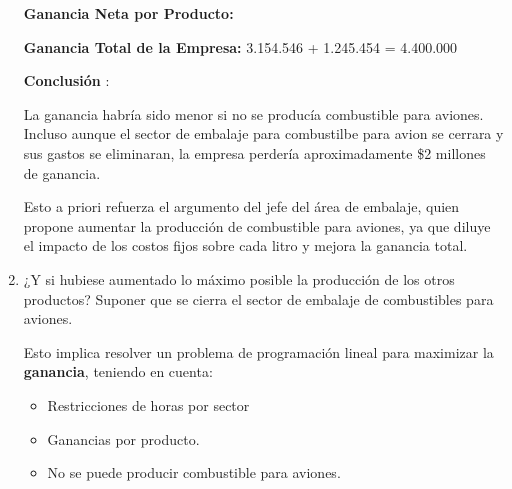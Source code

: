 \documentclass[10pt,a4paper]{article}
\begin{document}
\begin{enumerate}
    \vspace{0.5em}

    \textbf{Ganancia Neta por Producto:} 

    \begin{center}
    \end{center}

    \vspace{0.5em}

    \textbf{Ganancia Total de la Empresa: } 3.154.546 + 1.245.454  = 4.400.000

    \vspace{0.5em}

    \textbf{Conclusión }:

    La ganancia habría sido menor si no se producía combustible para aviones. \\
    Incluso aunque el sector de embalaje para combustilbe para avion se cerrara y sus gastos se eliminaran, la empresa perdería aproximadamente \$2 millones de ganancia. 

    Esto a priori refuerza el argumento del jefe del área de embalaje, quien propone aumentar la producción de combustible para aviones, 
    ya que diluye el impacto de los costos fijos sobre cada litro y mejora la ganancia total.
    
    \item ¿Y si hubiese aumentado lo máximo posible la producción de los otros productos? Suponer que se cierra el
    sector de embalaje de combustibles para aviones.

    Esto implica resolver un problema de programación lineal para maximizar la \textbf{ganancia}, teniendo en cuenta:

    \begin{itemize}

        \item Restricciones de horas por sector
        \item Ganancias por producto.
        \item No se puede producir combustible para aviones. \\


\end{itemize}
\end{enumerate}
\end{document}

